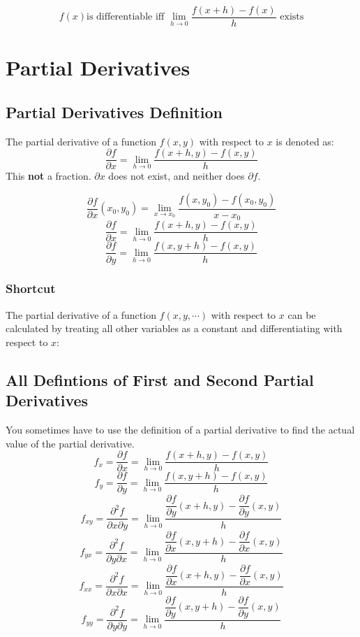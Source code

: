 \documentclass[a4paper,12pt,openany]{book}
\newcommand{\pd}[2]{\dfrac{\partial #1}{\partial #2}}
\newcommand{\pdm}[3]{\dfrac{\partial^2 #1}{\partial #2 \partial #3}}
\begin{document}
\[
    f(x) \text{is differentiable iff } \lim_{h \to 0} \dfrac{f(x+h) - f(x)}{h} \text{ exists}
\]
\section{Partial Derivatives}
\subsection{Partial Derivatives Definition}

The partial derivative of a function \(f(x, y)\) with respect to \(x\) is denoted as:
\[
    \pd{f}{x} = \lim_{h \to 0} \dfrac{f(x+h, y) - f(x, y)}{h}
\]
This \textbf{not} a fraction. $\partial x$ does not exist, and neither does $\partial f$.

\begin{equation}
    \pd{f}{x}(x_0, y_0) = 
    \lim_{x \to x_0} \dfrac{f(x, y_0) - f(x_0, y_0)}{x-x_0}
\end{equation}
\begin{equation}
    \pd{f}{x} = \lim_{h \to 0} \dfrac{f(x+h, y) - f(x, y)}{h}
\end{equation}
\begin{equation}
    \pd{f}{y} = \lim_{h \to 0} \dfrac{f(x, y+h) - f(x, y)}{h}
\end{equation}

\subsubsection{Shortcut}
The partial derivative of a function \(f(x, y, \cdots)\) with respect to \(x\) can be calculated by treating all other variables as a constant and differentiating with respect to \(x\):

\subsection{All Defintions of First and Second Partial Derivatives}
You sometimes have to use the definition of a partial derivative to find the actual value of the partial derivative. 
\begin{equation}
    f_x = \pd{f}{x} = \lim_{h \to 0} \dfrac{f(x+h, y) - f(x, y)}{h}
\end{equation}
\begin{equation}
    f_y = \pd{f}{y} = \lim_{h \to 0} \dfrac{f(x, y+h) - f(x, y)}{h}
\end{equation}
\begin{equation}
    f_{xy} = \pdm{f}{x}{y} = \lim_{h \to 0} \dfrac{\pd{f}{y}(x+h, y) - \pd{f}{y}(x, y)}{h}
\end{equation}
\begin{equation}
    f_{yx} = \pdm{f}{y}{x} = \lim_{h \to 0} \dfrac{\pd{f}{x}(x, y+h) - \pd{f}{x}(x, y)}{h}
\end{equation}
\begin{equation}
    f_{xx} = \pdm{f}{x}{x} = \lim_{h \to 0} \dfrac{\pd{f}{x}(x+h, y) - \pd{f}{x}(x, y)}{h}
\end{equation}
\begin{equation}
    f_{yy} = \pdm{f}{y}{y} = \lim_{h \to 0} \dfrac{\pd{f}{y}(x, y+h) - \pd{f}{y}(x, y)}{h}
\end{equation}
\end{document}
